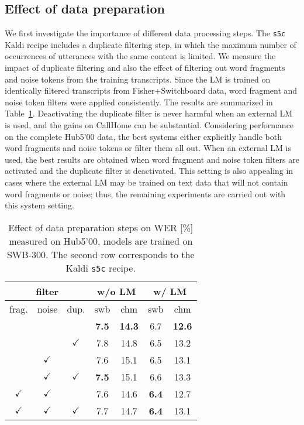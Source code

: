 \documentclass[a4paper]{article}
\begin{document}
\subsection{Effect of data preparation}
We first investigate the importance of different data processing steps.
The \texttt{s5c} Kaldi recipe includes a duplicate filtering step, in which the maximum number of occurrences of utterances with the same content is limited. We measure the impact of duplicate filtering and also the effect of filtering out word fragments and noise tokens from the training transcripts.
Since the LM is trained on identically filtered transcripts from Fisher+Switchboard data, word fragment and noise token filters were applied consistently.
The results are summarized in Table~\ref{tab:preparation}.
Deactivating the duplicate filter is never harmful when an external LM is used, and the gains on CallHome can be substantial. Considering performance on the complete Hub5'00 data, the best systems either explicitly handle both word fragments and noise tokens or filter them all out. When an external LM is used, the best results are obtained when word fragment and noise token filters are activated and the duplicate filter is deactivated. This setting is also appealing in cases where the external LM may be trained on text data that will not contain word fragments or noise; thus, the remaining experiments are carried out with this system setting.

\begin{table}
  \centering
  \caption{Effect of data preparation steps on WER [\%] measured on Hub5'00, models are trained on SWB-300. The second row corresponds to the Kaldi \texttt{s5c} recipe.}
  \vspace{-3mm}
  \begin{tabular}{|c|c|c|c|c|c|c|}
    \hline
  \multicolumn{3}{|c}{filter} 
               & \multicolumn{2}{|c|}{w/o LM} & \multicolumn{2}{|c|}{w/ LM}              \\
\hline
frag. &  noise & dup.       &  swb & chm  & swb & chm  \\
\hline
\hline
         &          &           & {\bf 7.5}  & {\bf 14.3} & 6.7        & {\bf 12.6} \\  
\hline         
         &          & $\checkmark$  & 7.8         & 14.8        & 6.5        & 13.2   \\  
\hline         
         & $\checkmark$ &           & 7.6         & 15.1        & 6.5        & 13.1   \\  
\hline         
         & $\checkmark$ & $\checkmark$  & {\bf 7.5}  & 15.1        & 6.6        & 13.3   \\  
\hline         
$\checkmark$ & $\checkmark$ &           & 7.6         & 14.6        & {\bf 6.4} & 12.7  \\  
\hline         
$\checkmark$ & $\checkmark$ & $\checkmark$  & 7.7         & 14.7        & {\bf 6.4}        & 13.1   \\  
\hline
\end{tabular}                              
\label{tab:preparation}
\vspace{-3mm}
\end{table}
\end{document}
